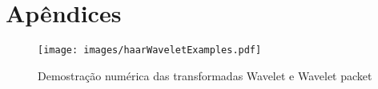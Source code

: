 \chapter{Apêndices}
	\begin{landscape}
		\begin{myenv}{1.5}
			\begin{figure}
				\texttt{[image: images/haarWaveletExamples.pdf]}
				\caption{Demostração numérica das transformadas Wavelet e Wavelet packet}
				\label{fig:haarWaveletExamples}
			\end{figure}
		\end{myenv}
	\end{landscape}
